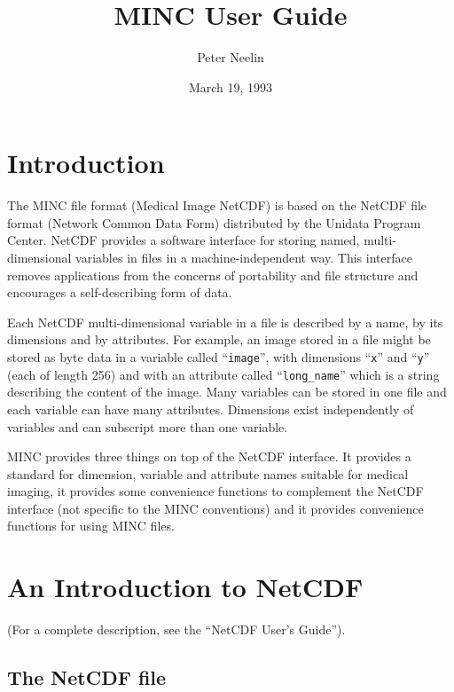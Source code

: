 \title{MINC User Guide}
\author{Peter Neelin}
\date{March 19, 1993}
\textwidth 6.0in
\oddsidemargin 0.125in
\textheight 8.5in
\topmargin -0.75in



\maketitle

\section{Introduction}

The MINC file format (Medical Image NetCDF) is based on the NetCDF
file format (Network Common Data Form) distributed by the Unidata
Program Center. NetCDF provides a software interface for storing
named, multi-dimensional variables in files in a machine-independent
way. This interface removes applications from the concerns of
portability and file structure and encourages a self-describing form
of data.

Each NetCDF multi-dimensional variable in a file is described by a
name, by its dimensions and by attributes. For example, an image
stored in a file might be stored as byte data in a variable called
``\verb+image+'', with dimensions ``\verb+x+'' and ``\verb+y+'' (each
of length 256) and with an attribute called ``\verb+long_name+'' which
is a string describing the content of the image. Many variables can be
stored in one file and each variable can have many attributes.
Dimensions exist independently of variables and can subscript more
than one variable.

MINC provides three things on top of the NetCDF interface. It provides
a standard for dimension, variable and attribute names suitable for
medical imaging, it provides some convenience functions to complement
the NetCDF interface (not specific to the MINC conventions) and it
provides convenience functions for using MINC files.

\section{An Introduction to NetCDF}

(For a complete description, see the ``NetCDF User's Guide'').

\subsection{The NetCDF file}

